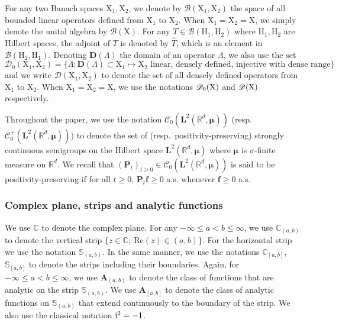 \documentclass[12pt]{amsart}
\numberwithin{equation}{section}
\newcommand{\bb}{\mathbb}
\newcommand{\cc}{\mathcal}
\renewcommand{\ge}{\geqslant}
\renewcommand{\le}{\leqslant}
\renewcommand{\geq}{\geqslant}
\renewcommand{\Re}{\textrm{Re}}
\newcommand{\tred}{}
\newcommand{\bmrm}[2][2]{\mathbf{#2}^{#1}}
\newcommand{\C}{\mathbf{C}}
\newcommand{\D}{\mathbf{D}}
\newcommand{\A}{\mathbf{A}}
\theoremstyle{definition}
\theoremstyle{assump}
\theoremstyle{remark}
\begin{document}
For any two Banach spaces $\mathrm{X}_1, \mathrm{X}_2$, we denote by $\mathscr{B}(\mathrm{X}_1, \mathrm{X}_2)$  the space of all bounded linear operators defined from $\mathrm{X}_1$ to $\mathrm{X}_2$. When $\mathrm{X}_1=\mathrm{X}_2=\mathrm{X}$, we simply denote the unital algebra  by $\mathscr{B}(\mathrm{X})$. For any $T\in\mathscr B(\mathrm{H}_1,\mathrm{H}_2)$ where $\mathrm{H}_1,\mathrm{H}_2$ are Hilbert spaces, the adjoint of $T$ is denoted by $\widehat{T}$, which is an element in $\mathscr B(\mathrm{H}_2, \mathrm{H}_1)$.  Denoting $\D(\Lambda)$ the domain of an operator $\Lambda$, we also use the set \[\mathscr{D}_0(\mathrm{X}_1,\mathrm{X}_2)=\{\Lambda: \D(\Lambda)\subset\mathrm{X}_1 \mapsto  \mathrm{X}_2 \textrm{ linear, densely defined, injective with dense range} \}\] and we write $\mathscr{D}(\mathrm{X}_1,\mathrm{X}_2)$ to denote the set of all densely defined operators from $\mathrm{X}_1$ to $\mathrm{X}_2$. When $\mathrm{X}_1=\mathrm{X}_2=\mathrm{X}$, we use the notations $\mathscr{D}_0({\rm X})$ and $\mathscr{D}({\rm X})$ respectively.

Throughout the paper, we use the notation $\cc{C}_0(\bmrm{L}(\bb{R}^d,{\bm \mu}))$ (resp.~$\cc{C}^+_0(\bmrm{L}(\bb{R}^d,{\bm \mu})))$ to denote the set of (resp.~positivity-preserving) strongly continuous semigroups on the Hilbert space $\bmrm{L}(\bb{R}^d,{\bm \mu})$ where ${\bm \mu}$ is $\sigma$-finite measure on $\bb{R}^d$. We recall that $(\bm P_t)_{t\geq0} \in \cc{C}_0(\bmrm{L}(\bb{R}^d,{\bm \mu}))$ is said to be positivity-preserving if for all $t\geq0$, $\bm P_t\mathbf f\ge 0$ a.s. whenever $\mathbf f\ge 0$ a.s.

\subsubsection{Complex plane, strips and analytic functions}
We use $\bb{C}$ to denote the complex plane. For any $-\infty\le a<b\le \infty$, we use $\bb{C}_{(a,b)}$ to denote the vertical strip $\{z\in\bb{C}; \ \Re(z)\in (a,b)\}$. For the horizontal strip we use the notation $\bb{S}_{(a,b)}$. In the same manner, we use the notations $\bb{C}_{[a,b]}$, $\bb{S}_{[a,b]}$ to denote the strips including their boundaries. Again, for $-\infty\le a<b\le\infty$, we use $\A_{(a,b)}$ to denote the class of functions that are analytic on the strip $\bb{S}_{(a,b)}$. We use $\A_{[a,b]}$ to denote the class of analytic functions on $\bb{S}_{(a,b)}$ that extend continuously to the boundary of the strip. We also use the classical notation ${\rm{i}}^2=-1$.
\end{document}
